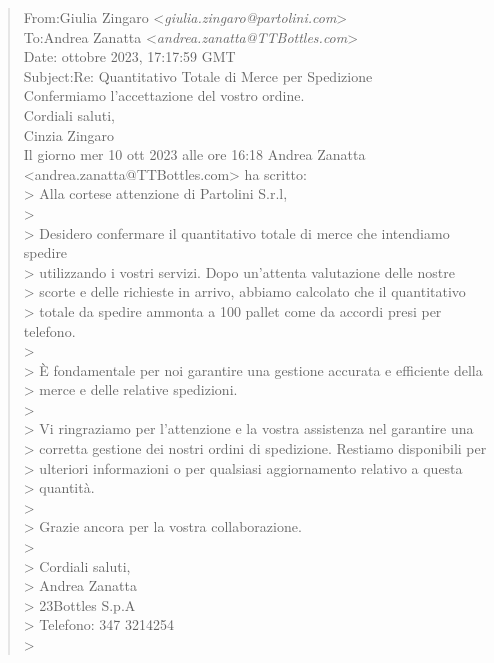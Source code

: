 \footnotesize
\begin{tcolorbox}[colback=gray!20, colframe=gray!50,sharp corners=southwest]
\begin{quote}
From:\qquad Giulia Zingaro <\textit{giulia.zingaro@partolini.com}>\\
To:\qquad Andrea Zanatta <\textit{andrea.zanatta@TTBottles.com}>\\
Date: ottobre 2023, 17:17:59 GMT\\
Subject:\qquad Re: Quantitativo Totale di Merce per Spedizione\vspace{14pt}\\
Confermiamo l'accettazione del vostro ordine.\\
Cordiali saluti,\\
Cinzia Zingaro\vspace{14pt}\\
Il giorno mer 10 ott 2023 alle ore 16:18 Andrea Zanatta <andrea.zanatta@TTBottles.com> ha scritto:\vspace{14pt}\\
> Alla cortese attenzione di Partolini S.r.l,\\
>\\
> Desidero confermare il quantitativo totale di merce che intendiamo spedire\\
> utilizzando i vostri servizi. Dopo un'attenta valutazione delle nostre\\
> scorte e delle richieste in arrivo, abbiamo calcolato che il quantitativo\\
> totale da spedire ammonta a 100 pallet come da accordi presi per telefono.\\
>\\
> È fondamentale per noi garantire una gestione accurata e efficiente della\\
> merce e delle relative spedizioni.\\
>\\
> Vi ringraziamo per l'attenzione e la vostra assistenza nel garantire una\\
> corretta gestione dei nostri ordini di spedizione. Restiamo disponibili per\\
> ulteriori informazioni o per qualsiasi aggiornamento relativo a questa\\
> quantità.\\
>\\
> Grazie ancora per la vostra collaborazione.\\
>\\
> Cordiali saluti,\\
> Andrea Zanatta\\
> 23Bottles S.p.A\\
> Telefono: 347 3214254\\
>
\end{quote}
\end{tcolorbox}
